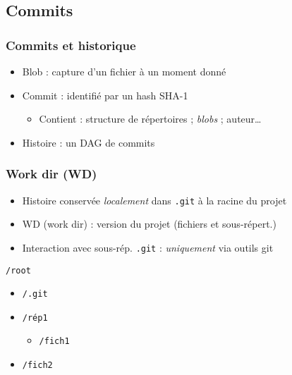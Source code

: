 \documentclass[english, french]{beamer}
\begin{document}
\subsection{Commits}
\begin{frame}
	\frametitle{Commits et historique}
	\begin{itemize}
		\item Blob : capture d’un fichier à un moment donné
		\item Commit : identifié par un hash SHA-1
		\begin{itemize}
			\item Contient : structure de répertoires ; \emph{blobs} ; auteur…
		\end{itemize}
		\item Histoire : un DAG de \og{}commits\fg{}
	\end{itemize}
	{
		\centering
		\par
	}
\end{frame}

\begin{frame}
	\frametitle{Work dir (WD)}
	\begin{itemize}
		\item Histoire conservée \emph{localement} dans \texttt{.git} à la racine du projet
		\item WD (\og{}work dir\fg{}) : version du projet (fichiers et sous-répert.)
		\item Interaction avec sous-rép. \texttt{.git} : \emph{uniquement} via outils git
	\end{itemize}
	\texttt{/root}
	\begin{itemize}
		\item[] \texttt{/.git}
		\item[] \texttt{/rép1}
		\begin{itemize}
			\item[] \texttt{/fich1}
		\end{itemize}\vspace{-0.8ex}
		\item[] \texttt{/fich2}
	\end{itemize}
\end{frame}
\end{document}
